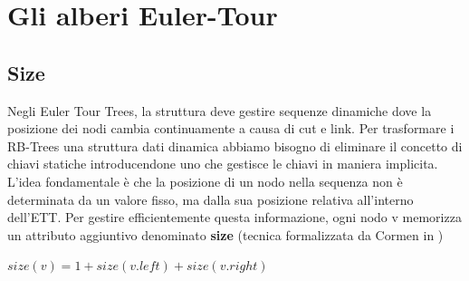 \setchapterpreamble[u]{\margintoc}
\chapter{Gli alberi Euler-Tour}

\section{Size}
Negli Euler Tour Trees, la struttura deve gestire sequenze 
dinamiche dove la posizione dei nodi cambia continuamente a
causa di cut e link. Per trasformare i RB-Trees una struttura
dati dinamica abbiamo bisogno di eliminare il concetto
di chiavi statiche introducendone uno che gestisce le chiavi 
in maniera implicita.\\
L'idea fondamentale è che la posizione di un nodo nella 
sequenza non è determinata da un valore fisso, ma dalla 
sua posizione relativa all'interno dell'ETT.
Per gestire efficientemente questa informazione, 
ogni nodo v memorizza un attributo aggiuntivo denominato 
\textbf{size} (tecnica formalizzata da Cormen in \cite{CLRS09})

\begin{definition}
    $size(v) = 1 + size(v.left) +size(v.right)$ 
\end{definition}


